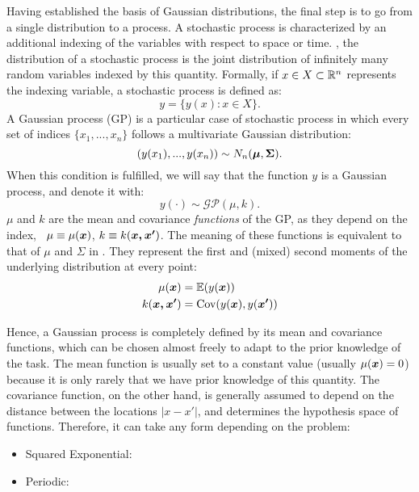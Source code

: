 Having established the basis of Gaussian distributions, the final step is to go from a single distribution to a process. A stochastic process is characterized by an additional indexing of the variables with respect to space or time. , the distribution of a stochastic process is the joint distribution of infinitely many random variables indexed by this quantity. Formally, if $x \in X \subset \mathbb{R}^n$ represents the indexing variable, a stochastic process is defined as:
\begin{equation*}
    y = \{ y(x) : x\in X\}.
\end{equation*}
A Gaussian process (GP) is a particular case of stochastic process in which every set of indices $\{x_1,...,x_n\}$ follows a multivariate Gaussian distribution:
\begin{equation*}
    (y(x_1), ..., y(x_n)) \sim N_n(\boldsymbol{\mu}, \boldsymbol{\Sigma}).
\end{equation*}
When this condition is fulfilled, we will say that the function $y$ is a Gaussian process, and denote it with:
\begin{equation*}
    y(\cdot)\sim\mathcal{GP}(\mu, k).
\end{equation*}
$\mu$ and $k$ are the mean and covariance \textit{functions} of the GP, as they depend on the index, \ie~$\mu \equiv \mu(\boldsymbol{x})$, $k \equiv k(\boldsymbol{x, x'})$. The meaning of these functions is equivalent to that of $\mu$ and $\Sigma$ in . They represent the first and (mixed) second moments of the underlying distribution at every point:
\begin{align*}
    \mu(\boldsymbol{x}) &= \mathbb{E}(y(\boldsymbol{x}))  \\
    k(\boldsymbol{x, x'}) &= \text{Cov}(y(\boldsymbol{x}), y(\boldsymbol{x'}))  \\
\end{align*}

Hence, a Gaussian process is completely defined by its mean and covariance functions, which can be chosen almost freely to adapt to the prior knowledge of the task. The mean function is usually set to a constant value (usually $\mu(\boldsymbol{x}) = 0$) because it is only rarely that we have prior knowledge of this quantity. The covariance function, on the other hand, is generally assumed to depend on the distance between the locations $|x-x'|$, and determines the hypothesis space of functions. Therefore, it can take any form depending on the problem:
\begin{itemize}
    \item Squared Exponential:
    \item Periodic: 
\end{itemize}

